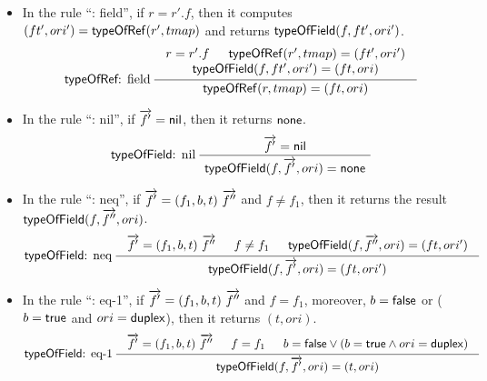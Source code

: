 \begin{itemize}
	\item In the rule ``{\typeofref: field}'', if $r = r'.f$, then it computes $(ft', ori')= {\sf typeOfRef}(r', tmap)$ and returns ${\sf typeOfField}(f, ft', ori')$. 
	\begin{gather*}
		\infer[\typeofref: field]
		{\seqq{\typeofref(r, tmap) = (ft, ori)}}
		{
		\begin{array}{c}
			\seqq{r = r'.f} \hspace{15pt} \typeofref(r', tmap) = (ft', ori') \\
			 \typeoffield(f, ft', ori') = (ft, ori)
		\end{array}
		}
	\end{gather*}
%
	\item In the rule ``{\typeoffield: nil}'', if $\overrightarrow{f'} = {\sf nil}$, then it returns ${\sf none}$. 
	\begin{gather*}	
	\infer[\typeoffield: nil]
	{\seqq{\typeoffield(f, \myvec{f'}, ori) = \svnone}}
	{\seqq{\myvec{f'} = \nil}}
	\end{gather*}
%	
	\item In the rule ``\typeoffield: neq'', if $\overrightarrow{f'} = (f_1, b, t)\ \overrightarrow{f''}$ and  $f \neq f_1$, then it returns the result ${\sf typeOfField}(f, \overrightarrow{f''}, ori)$. 
	\begin{gather*}
	\infer[\typeoffield: neq]
	{\seqq{\typeoffield(f, \myvec{f'}, ori) = (ft, ori')}}
	{
	\begin{array}{c}
		\myvec{f'} = (f_1, b, t)\ \myvec{f''} \hspace{15pt} f \neq f_1 \hspace{15pt}
		\typeoffield(f, \myvec{f''}, ori) = (ft, ori')
	\end{array}
	}	
	\end{gather*}
	\item In the rule ``{\typeoffield: eq-1}'', if $\overrightarrow{f'} = (f_1, b, t)\ \overrightarrow{f''}$ and $f = f_1$, moreover, $b = {\sf false}$ or ($b = {\sf true}$ and $ori = {\sf duplex}$), then  it returns $(t, ori)$. 
	\begin{gather*}
	\infer[\typeoffield: eq-1]
	{\seqq{\typeoffield(f, \myvec{f'}, ori) = (t, ori)}}
	{
	\begin{array}{c}
		\myvec{f'} = (f_1, b, t)\ \myvec{f''} \hspace{15pt} f = f_1  \hspace{15pt}
		b = \lfalse \vee (b = \ltrue \wedge ori = \duplex)
	\end{array}
	}
	\end{gather*}


\end{itemize}
